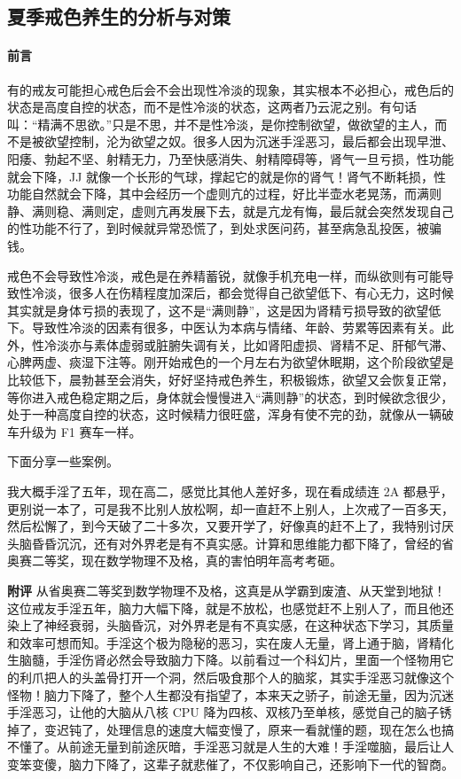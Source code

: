 \subsection{夏季戒色养生的分析与对策}

\paragraph*{前言}

有的戒友可能担心戒色后会不会出现性冷淡的现象，其实根本不必担心，戒色后的状态是高度自控的状态，而不是性冷淡的状态，这两者乃云泥之别。有句话叫：“精满不思欲。”只是不思，并不是性冷淡，是你控制欲望，做欲望的主人，而不是被欲望控制，沦为欲望之奴。很多人因为沉迷手淫恶习，最后都会出现早泄、阳痿、勃起不坚、射精无力，乃至快感消失、射精障碍等，肾气一旦亏损，性功能就会下降，JJ 就像一个长形的气球，撑起它的就是你的肾气！肾气不断耗损，性功能自然就会下降，其中会经历一个虚则亢的过程，好比半壶水老晃荡，而满则静、满则稳、满则定，虚则亢再发展下去，就是亢龙有悔，最后就会突然发现自己的性功能不行了，到时候就异常恐慌了，到处求医问药，甚至病急乱投医，被骗钱。

戒色不会导致性冷淡，戒色是在养精蓄锐，就像手机充电一样，而纵欲则有可能导致性冷淡，很多人在伤精程度加深后，都会觉得自己欲望低下、有心无力，这时候其实就是身体亏损的表现了，这不是“满则静”，这是因为肾精亏损导致的欲望低下。导致性冷淡的因素有很多，中医认为本病与情绪、年龄、劳累等因素有关。此外，性冷淡亦与素体虚弱或脏腑失调有关，比如肾阳虚损、肾精不足、肝郁气滞、心脾两虚、痰湿下注等。刚开始戒色的一个月左右为欲望休眠期，这个阶段欲望是比较低下，晨勃甚至会消失，好好坚持戒色养生，积极锻炼，欲望又会恢复正常，等你进入戒色稳定期之后，身体就会慢慢进入“满则静”的状态，到时候欲念很少，处于一种高度自控的状态，这时候精力很旺盛，浑身有使不完的劲，就像从一辆破车升级为 F1 赛车一样。

下面分享一些案例。

\begin{case}
    我大概手淫了五年，现在高二，感觉比其他人差好多，现在看成绩连 2A 都悬乎，更别说一本了，可是我不比别人放松啊，却一直赶不上别人，上次戒了一百多天，然后松懈了，到今天破了二十多次，又要开学了，好像真的赶不上了，我特别讨厌头脑昏昏沉沉，还有对外界老是有不真实感。计算和思维能力都下降了，曾经的省奥赛二等奖，现在数学物理不及格，真的害怕明年高考考砸。

    \textbf{附评} 从省奥赛二等奖到数学物理不及格，这真是从学霸到废渣、从天堂到地狱！这位戒友手淫五年，脑力大幅下降，就是不放松，也感觉赶不上别人了，而且他还染上了神经衰弱，头脑昏沉，对外界老是有不真实感，在这种状态下学习，其质量和效率可想而知。手淫这个极为隐秘的恶习，实在废人无量，肾上通于脑，肾精化生脑髓，手淫伤肾必然会导致脑力下降。以前看过一个科幻片，里面一个怪物用它的利爪把人的头盖骨打开一个洞，然后吸食那个人的脑浆，其实手淫恶习就像这个怪物！脑力下降了，整个人生都没有指望了，本来天之骄子，前途无量，因为沉迷手淫恶习，让他的大脑从八核 CPU 降为四核、双核乃至单核，感觉自己的脑子锈掉了，变迟钝了，处理信息的速度大幅变慢了，原来一看就懂的题，现在怎么也搞不懂了。从前途无量到前途灰暗，手淫恶习就是人生的大难！手淫噬脑，最后让人变笨变傻，脑力下降了，这辈子就悲催了，不仅影响自己，还影响下一代的智商。
\end{case}

